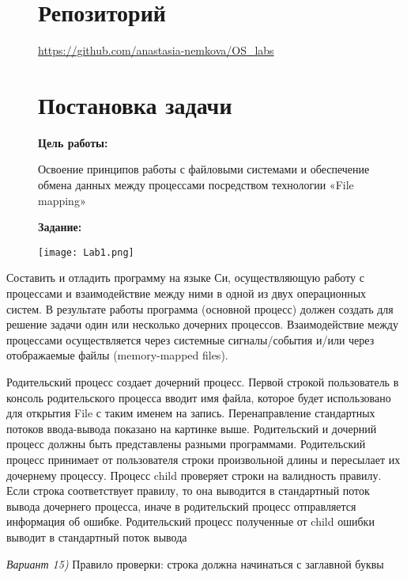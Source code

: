 \documentclass[a4paper, 14pt]{article}
\begin{document}
\begin{figure}
\section*{Репозиторий}   
\vspace{2ex}
\url{https://github.com/anastasia-nemkova/OS_labs}

\section*{Постановка задачи}   
\textbf{Цель работы:}
\vspace{2ex}

Освоение принципов работы с файловыми системами и обеспечение обмена данных между процессами посредством технологии «File mapping»

\vspace{4ex}
\textbf{Задание:}
\vspace{2ex}

    \centering
    \texttt{[image: Lab1.png]}
    \label{fig:enter-label}
\end{figure}

Составить и отладить программу на языке Си, осуществляющую работу с процессами и взаимодействие между ними в одной из двух операционных систем. В результате работы программа (основной процесс) должен создать для решение задачи один или несколько дочерних процессов. Взаимодействие между процессами осуществляется через системные сигналы/события и/или через отображаемые файлы (memory-mapped files).

Родительский процесс создает дочерний процесс. Первой строкой пользователь в консоль родительского процесса вводит имя файла, которое будет использовано для открытия File с таким именем на запись. Перенаправление стандартных потоков ввода-вывода показано на картинке выше. Родительский и дочерний процесс должны быть представлены разными программами. Родительский процесс принимает от пользователя строки произвольной длины и пересылает их дочернему процессу. Процесс child проверяет строки на валидность правилу. Если строка соответствует правилу, то она выводится в стандартный поток вывода дочернего процесса, иначе в родительский процесс отправляется информация об ошибке. Родительский процесс полученные от child ошибки выводит в стандартный поток вывода\newline

\textit{Вариант 15)} Правило проверки: строка должна начинаться с заглавной буквы
\end{document}

